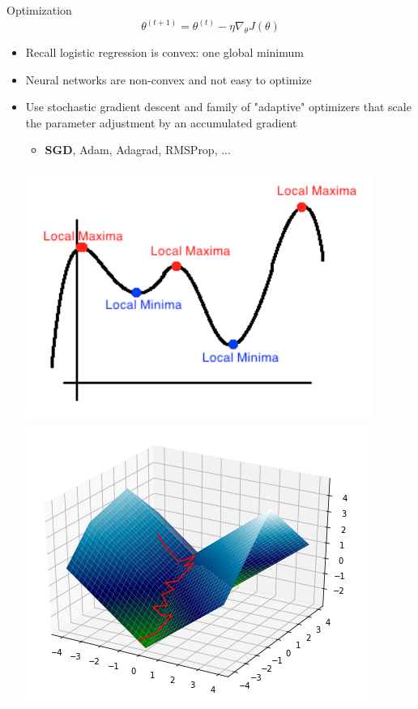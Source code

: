 \begin{frame}{Optimization}
\[ \theta^{(t+1)} = \theta^{(t)} - \eta \nabla_\theta J(\theta) \]
\begin{itemize}[<+->]
\item Recall logistic regression is convex: one global minimum
\item Neural networks are non-convex and not easy to optimize
\item Use stochastic gradient descent and family of "adaptive" optimizers that scale the parameter adjustment by an accumulated gradient
\begin{itemize}
\item \textbf{SGD}, Adam, Adagrad, RMSProp, ...
\end{itemize}
\centering
\includegraphics[scale=0.25]{figures/ff/nonconvex.png}
\includegraphics[scale=0.25]{figures/ff/saddlepoint.png}
\end{itemize}
\end{frame}

